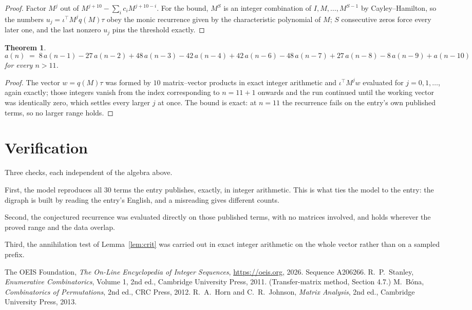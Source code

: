 \documentclass[11pt,a4paper]{article}
\theoremstyle{plain}
\newtheorem{theorem}{Theorem}
\theoremstyle{definition}
\begin{document}
\begin{proof}
Factor $M^{j}$ out of $M^{j+10}-\sum_ic_iM^{j+10-i}$. For the bound, $M^{S}$
is an integer combination of $I,M,\dots,M^{S-1}$ by Cayley--Hamilton, so the numbers
$u_j=\iota^{\!\top}M^{j}q(M)\tau$ obey the monic recurrence given by the characteristic
polynomial of $M$; $S$ consecutive zeros force every later one, and the last nonzero $u_j$
pins the threshold exactly.
\end{proof}

\begin{theorem}
\[
a(n)\;=\;8\,a(n-1) - 27\,a(n-2) + 48\,a(n-3) - 42\,a(n-4) + 42\,a(n-6) - 48\,a(n-7) + 27\,a(n-8) - 8\,a(n-9) + a(n-10)
\]
for every $n>11$.
\end{theorem}

\begin{proof}
The vector $w=q(M)\tau$ was formed by $10$ matrix--vector products in exact integer
arithmetic and $\iota^{\!\top}M^{j}w$ evaluated for $j=0,1,\dots$, again exactly; those
integers vanish from the index corresponding to $n=11+1$ onwards and the run continued
until the working vector was identically zero, which settles every larger $j$ at once. The bound is exact: at $n=11$ the recurrence fails on the entry's own published terms, so no larger range holds.
\end{proof}

\section{Verification}

Three checks, each independent of the algebra above.

First, the model reproduces all $30$ terms the entry publishes, exactly, in integer
arithmetic. This is what ties the model to the entry: the digraph is built by reading the
entry's English, and a misreading gives different counts.

Second, the conjectured recurrence was evaluated directly on those published terms, with no
matrices involved, and holds wherever the proved range and the data overlap.

Third, the annihilation test of Lemma~\ref{lem:crit} was carried out in exact integer
arithmetic on the whole vector rather than on a sampled prefix.

\begin{thebibliography}{9}
 The OEIS Foundation, \emph{The On-Line Encyclopedia of Integer
Sequences}, \url{https://oeis.org}, 2026. Sequence A206266.
 R.~P.~Stanley, \emph{Enumerative Combinatorics}, Volume 1, 2nd ed.,
Cambridge University Press, 2011. (Transfer-matrix method, Section 4.7.)
 M.~B\'ona, \emph{Combinatorics of Permutations}, 2nd ed., CRC
Press, 2012.
 R.~A.~Horn and C.~R.~Johnson, \emph{Matrix Analysis}, 2nd ed., Cambridge
University Press, 2013.
\end{thebibliography}
\end{document}
